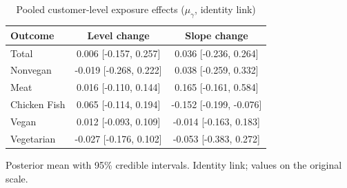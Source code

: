 \begin{table}[H]
\centering
\caption{Pooled customer-level exposure effects ($\mu_\gamma$, identity link)}
\label{tab:a5_mu_gamma}
\begin{tabular}{lcc}
\toprule
Outcome & Level change & Slope change \\
\midrule
Total & 0.006 [-0.157, 0.257] & 0.036 [-0.236, 0.264] \\
Nonvegan & -0.019 [-0.268, 0.222] & 0.038 [-0.259, 0.332] \\
Meat & 0.016 [-0.110, 0.144] & 0.165 [-0.161, 0.584] \\
Chicken Fish & 0.065 [-0.114, 0.194] & -0.152 [-0.199, -0.076] \\
Vegan & 0.012 [-0.093, 0.109] & -0.014 [-0.163, 0.183] \\
Vegetarian & -0.027 [-0.176, 0.102] & -0.053 [-0.383, 0.272] \\
\bottomrule
\end{tabular}
\par\smallskip\footnotesize Posterior mean with 95\% credible intervals. Identity link; values on the original scale.
\end{table}
